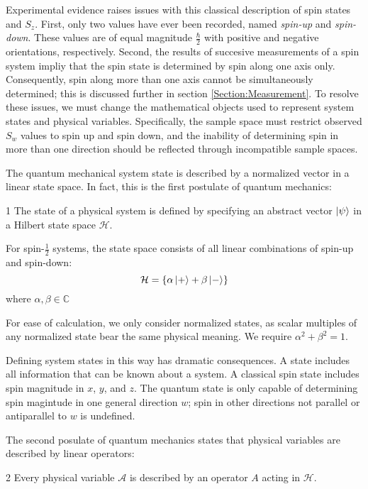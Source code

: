 Experimental evidence raises issues with this classical description of spin states and $S_z$. First, only two values have ever been recorded, named \textit{spin-up} and \textit{spin-down}. These values are of equal magnitude $\frac{\hbar}{2}$ with positive and negative orientations, respectively. Second, the results of succesive measurements of a spin system impliy that the spin state is determined by spin along one axis only. Consequently, spin along more than one axis cannot be simultaneously determined; this is discussed further in section \ref{Section:Measurement}. To resolve these issues, we must change the mathematical objects used to represent system states and physical variables. Specifically, the sample space must restrict observed $S_w$ values to spin up and spin down, and the inability of determining spin in more than one direction should be reflected through incompatible sample spaces.

The quantum mechanical system state is described by a normalized vector in a linear state space. In fact, this is the first postulate of quantum mechanics:
\begin{Thm:Postulate}{1}
    The state of a physical system is defined by specifying an abstract vector $\ket{\psi}$ in a Hilbert state space $\mathcal{H}$.
\end{Thm:Postulate}

For spin-$\frac{1}{2}$ systems, the state space consists of all linear combinations of spin-up and spin-down:
\begin{equation}
    \mathcal{H} = \{\alpha\ket{+} + \beta\ket{-}\}
\end{equation}
where $\alpha, \beta \in \mathbb{C}$

For ease of calculation, we only consider normalized states, as scalar multiples of any normalized state bear the same physical meaning. We require $\alpha^2 + \beta^2 = 1$.

Defining system states in this way has dramatic consequences. A state includes all information that can be known about a system. A classical spin state includes spin magnitude in $x$, $y$, and $z$. The quantum state is only capable of determining spin magintude in one general direction $w$; spin in other directions not parallel or antiparallel to $w$ is undefined.

The second posulate of quantum mechanics states that physical variables are described by linear operators:
\begin{Thm:Postulate}{2}
    Every physical variable $\mathcal{A}$ is described by an operator $A$ acting in $\mathcal{H}$.
\end{Thm:Postulate}

